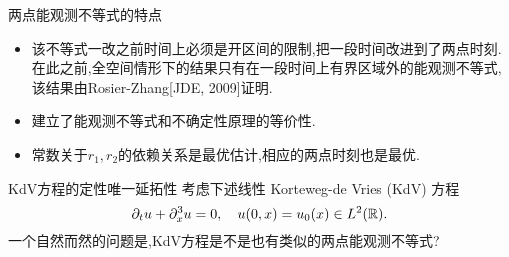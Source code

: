\begin{frame}[t]{两点能观测不等式的特点}
  \begin{itemize}
    \item 该不等式一改之前时间上必须是开区间的限制,把一段时间改进到了两点时刻.在此之前,全空间情形下的结果只有在一段时间上有界区域外的能观测不等式,该结果由Rosier-Zhang[JDE, 2009]证明.
    \item 建立了能观测不等式和不确定性原理的等价性.
    \item 常数关于$r_1,r_2$的依赖关系是最优估计,相应的两点时刻也是最优.
  \end{itemize}
\end{frame}


\begin{frame}[t]{KdV方程的定性唯一延拓性}
  考虑下述线性 Korteweg-de Vries (KdV) 方程
  \begin{equation}\label{kdv}
    \partial_t u +\partial_x^3u=0,\quad u(0,x)=u_0(x)\in L^2(\mathbb{R}).
  \end{equation}
一个自然而然的问题是,KdV方程是不是也有类似的两点能观测不等式?
\end{frame}

